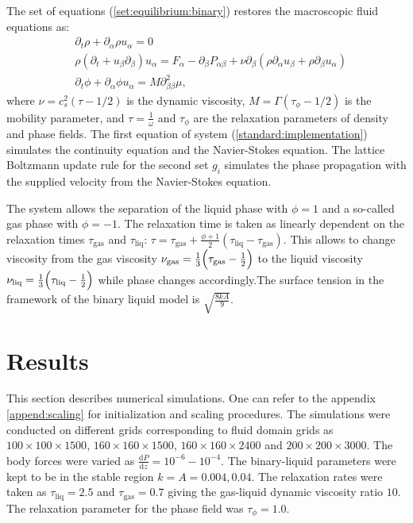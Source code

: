 \documentclass{article}
\begin{document}
The set of equations (\ref{set:equilibrium:binary}) restores the macroscopic
fluid equations as:
\begin{equation}
\label{full:navier:stokes}
\begin{aligned}
&\partial_t \rho+ \partial_{\alpha} \rho u_{\alpha}=0\\
&\rho\left(\partial_t+u_{\beta}\partial_{\beta}\right) u_{\alpha}=F_{\alpha}
-\partial_{\beta}P_{\alpha \beta} +
\nu\partial_{\beta}\left(\rho\partial_{\alpha}u_{\beta}+\rho\partial_{\beta} u_{\alpha}\right)\\
&\partial_t \phi + \partial_{\alpha} \phi u_{\alpha}=M \partial^2_{\beta\beta} \mu,
\end{aligned}
\end{equation}
where $\nu=c_s^2 (\tau-1/2)$ is the dynamic viscosity,
$M=\Gamma(\tau_{\phi}-1/2)$ is the mobility parameter, and $\tau=\frac{1}{\omega}$ and $\tau_{\phi}$
are the relaxation parameters of density and phase fields. The first equation of system
(\ref{standard:implementation}) simulates the continuity equation and the Navier-Stokes equation.
The lattice Boltzmann update rule for the second set $g_i$ simulates the phase propagation with the
supplied velocity from the Navier-Stokes equation.

The system allows the separation of the liquid
phase with $\phi=1$ and a so-called gas phase with $\phi=-1$. The
relaxation time is taken as linearly dependent on the relaxation
times $\tau_{\mathrm{gas}}$ and $\tau_{\mathrm{liq}}$:
$\tau=\tau_{\mathrm{gas}}+\frac{\phi+1}{2}(\tau_{\mathrm{liq}}-\tau_{\mathrm{gas}})$. This allows
to change viscosity from the gas viscosity
$\nu_{\mathrm{gas}}=\frac{1}{3}\Bigl(\tau_{\mathrm{gas}}-\frac{1}{2}\Bigr)$ to the liquid viscosity
$\nu_{\mathrm{liq}}=\frac{1}{3}\Bigl(\tau_{\mathrm{liq}}-\frac{1}{2}\Bigr)$ while phase changes
accordingly.The surface tension in the framework of the binary liquid model is $\sqrt{\frac{8 k
A}{9}}$.

\section{Results}
\label{sec:results}
This section describes numerical simulations. One can refer to the appendix \ref{append:scaling} for
initialization and scaling procedures. The simulations were conducted on different grids
corresponding to fluid domain grids as $100 \times 100 \times 1500$, $160 \times 160 \times 1500$,
$160 \times 160 \times 2400$ and $200 \times 200 \times 3000$. The body forces were varied as
$\frac{\mathrm{d}P}{\mathrm{d}z}=10^{-6}-10^{-4}$. The binary-liquid parameters were kept to be in
the stable region $k=A=0.004,0.04$. The relaxation rates were taken as $\tau_{\mathrm{liq}}=2.5$
and $\tau_{\mathrm{gas}}=0.7$ giving the gas-liquid dynamic viscosity ratio $10$. The relaxation
parameter for the phase field was $\tau_{\phi}=1.0$.
\end{document}
